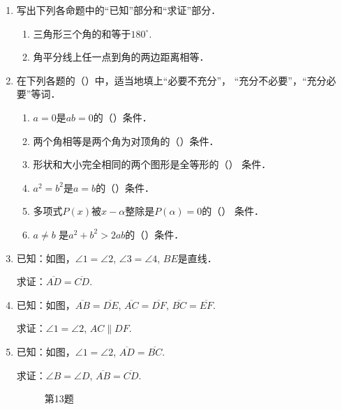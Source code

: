 \begin{enumerate}
\item 写出下列各命题中的“已知”部分和“求证”部分．
\begin{enumerate}
	\item 三角形三个角的和等于$180^{\circ}$.
	\item 角平分线上任一点到角的两边距离相等．
\end{enumerate}

\item 在下列各题的（\qquad）中，适当地填上“必要不充分”，
“充分不必要”，“充分必要”等词．
\begin{enumerate}
	\item $a=0$是$ab=0$的（\qquad）条件．
	\item 两个角相等是两个角为对顶角的（\qquad）条件．
	\item 形状和大小完全相同的两个图形是全等形的（\qquad）
	条件．
	\item $a^2=b^2$是$a=b$的（\qquad）条件．
	\item 多项式$P(x)$被$x-\alpha$整除是$P(\alpha)=0$的（\qquad）
	条件．
	\item $a\ne b$ 是$a^2+b^2>2ab$的（\qquad）条件．
\end{enumerate}

\item 已知：如图，$\angle 1=\angle 2$, $\angle 3=\angle 4$, $BE$是直线．

求证：$\overline{AD}=\overline{CD}$.

\item 已知：如图，$\overline{AB}=\overline{DE}$, $\overline{AC}=\overline{DF}$, $\overline{BC}=\overline{EF}$.

求证：$\angle 1=\angle 2$, $AC\parallel DF$.
\item 已知：如图，$\angle 1=\angle 2$, $\overline{AD}=\overline{BC}$.

求证：$\angle B=\angle D$, $\overline{AB}=\overline{CD}$.

\begin{figure}[htp]\centering
    \begin{minipage}[t]{0.48\textwidth}
    \centering
{}
	\caption*{第12题}
    \end{minipage}
    \begin{minipage}[t]{0.48\textwidth}
    \centering
	\caption*{第13题}
    \end{minipage}
    \end{figure}


\end{enumerate}

